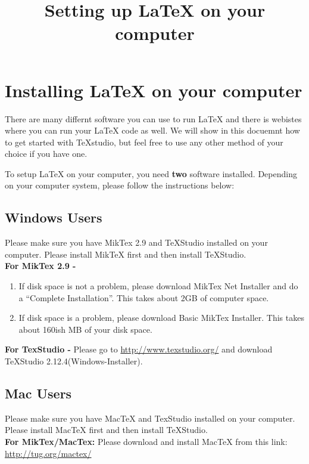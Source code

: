 \documentclass[]{article}
\title{Setting up {\LaTeX} on your computer}
\begin{document}
\maketitle
\section*{Installing {\LaTeX} on your computer}
There are many differnt software you can use to run {\LaTeX} and there is webistes where you can run your {\LaTeX} code as well. We will show in this docuemnt how to get started with TeXstudio, but feel free to use any other method of your choice if you have one.

To setup {\LaTeX} on your computer, you need \textbf{two} software installed. Depending on your computer system, please follow the instructions below:

\subsection*{Windows Users}
Please make sure you have MikTex 2.9 and TeXStudio installed on your computer. Please install MikTeX first and then install TeXStudio. \\

\textbf{For MikTex 2.9 -}
\begin{enumerate}
\item If disk space is not a problem, please download MikTex Net Installer and do a ``Complete Installation''. This takes about 2GB of computer space. 

\item If disk space is a problem, please download Basic MikTex Installer. This takes about 160ish MB of your disk space. 
\end{enumerate}

\textbf{For TexStudio -  }
Please go to \url{http://www.texstudio.org/} and download TeXStudio 2.12.4(Windows-Installer). 

\subsection*{Mac Users}
Please make sure you have MacTeX and TexStudio installed on your computer. Please install MacTeX first and then install TeXStudio.  \\

\textbf{For MikTex/MacTex:}
Please download and install MacTeX from this link: \url{http://tug.org/mactex/} \\
\end{document}
